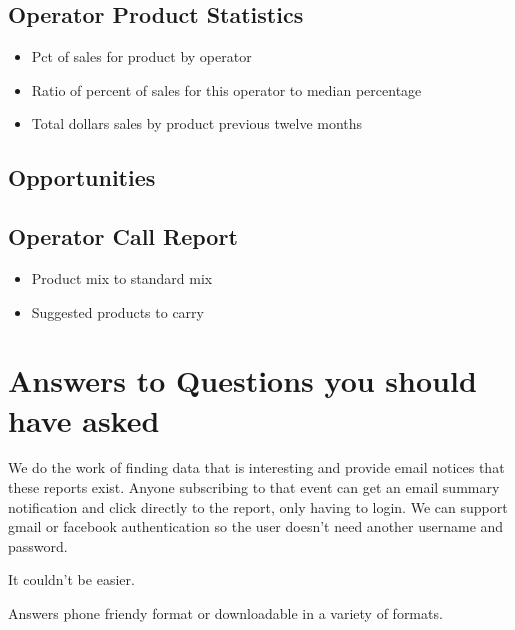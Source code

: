 \documentclass[letterpaper,10pt,english]{sphinxmanual}
\begin{document}
\subsection{Operator Product Statistics}
\label{\detokenize{Analyze:operator-product-statistics}}\begin{itemize}
\item {} 
Pct of sales for product by operator

\item {} 
Ratio of percent of sales for this operator to median percentage

\item {} 
Total dollars sales by product previous twelve months

\end{itemize}


\subsection{Opportunities}
\label{\detokenize{Analyze:opportunities}}

\subsection{Operator Call Report}
\label{\detokenize{Analyze:operator-call-report}}\begin{itemize}
\item {} 
Product mix to standard mix

\item {} 
Suggested products to carry

\end{itemize}


\section{Answers to Questions you should have asked}
\label{\detokenize{Answers:answers-to-questions-you-should-have-asked}}\label{\detokenize{Answers::doc}}
We do the work of finding data that is interesting and provide email notices
that these reports exist.  Anyone subscribing to that event can get an email summary
notification and click directly to the report, only having to login.  We can support
gmail or facebook authentication so the user doesn’t need another username and password.

It couldn’t be easier.

Answers phone friendy format or downloadable in a variety of formats.
\end{document}
